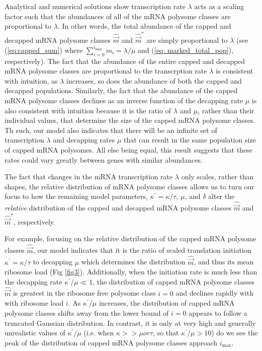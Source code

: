\documentclass[10pt,letterpaper]{article}
\newcommand{\imax}{\ensuremath{{i_{\max}}}\xspace}
\newcommand{\kappaprime}{\ensuremath{\kappa^{\prime}}\xspace}
\newcommand{\mvec}{\ensuremath{\vec{m}}\xspace}
\newcommand{\mvechat}{\ensuremath{\hat{\mvec}}\xspace}
\newcommand{\mvechatstar}{\ensuremath{\mvechat^*}\xspace}
\begin{document}
Analytical and numerical solutions show transcription rate $\lambda$ acts as a scaling factor such that the abundances of all of the mRNA polysome classes are proportional to $\lambda$.
In other words, the total abundance of the capped and decapped mRNA polysome classes $\mvechat$ and $\mvechatstar$ are simply proportional to $\lambda$ (see (\ref{eq:capped_sum}) where $\sum_{i = 0} ^\imax m_i = \lambda/\mu$ and (\ref{eq: marked_total_pop}), respectively).
The fact that the abundance of the entire capped and decapped mRNA polysome classes are proportional to the transcrption rate $\lambda$ is consistent with intuition, as $\lambda$ increases, so does the abundance of both the capped and decapped populations.
Similarly, the fact that the abundance of the capped mRNA polysome classes declines as an inverse function of the decapping rate $\mu$ is also consistent with intuition
because it is the ratio of $\lambda$ and $\mu$, rather than their individual values, that determine the size of the capped mRNA polysome classes.
Th such, our model also indicates that there will be an infinite set of transcription $\lambda$ and decapping rates $\mu$ that can result in the same population size of capped mRNA polysomes.
All else being equal, this result suggests that these rates could vary greatly between genes with similar abundances.


The fact that changes in the mRNA transcription rate  $\lambda$ only scales, rather than shapes, the relative distribution of mRNA polysome classes allows us to turn our focus to how the remaining model parameters, $\kappaprime = \kappa/\tau$, $\mu$, and $\delta$ alter the \emph{relative} distribution of the capped and decapped mRNA polysome classes \mvechat and \mvechatstar, respectively.

For example, focusing on the relative distribution of the capped mRNA polysome classes $\mvechat$, our model indicates that it is the ratio of scaled translation initiation $\kappaprime = \kappa/\tau$ to decapping $\mu$ which determines the distribution \mvechat, and thus its mean ribosome load  (Fig \ref{fig3}).
Additionally, when the initiation rate is much less than the decapping rate $\kappaprime/\mu \ll 1$, the distribution of capped mRNA polysome classes $\mvechat$ is greatest in the ribosome free polysome class $i=0$ and declines rapidly with with ribosome load $i$.
As $\kappaprime/\mu$ increases, the distribution of capped mRNA polysome classes shifts away from the lower bound of $i = 0$ appears to follow a truncated Gaussian distribution.
In contrast, it is only at very high and generally unrealistic values of $\kappaprime/\mu$ (i.e.  when $\kappa>>\mu or \tau$, so that $\kappaprime/\mu > 10$) do we see the peak of the distribution of capped mRNA polysome classes approach $\imax$.
\end{document}
